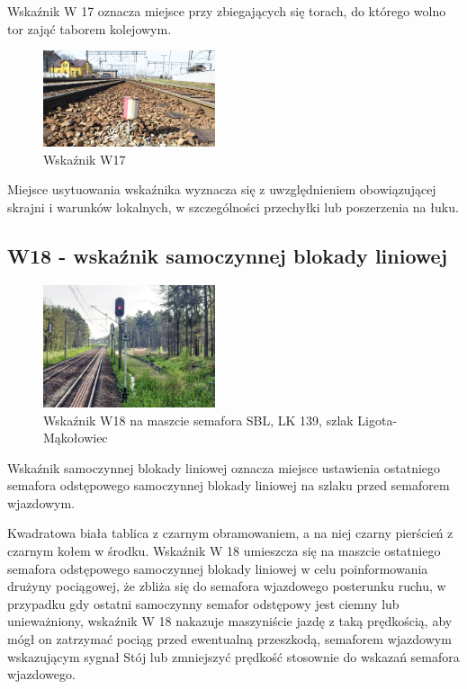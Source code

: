 \begin{tcolorbox}[colback=black!5!white,colframe=white!55!black,title=Wskaźnik W17]
Wskaźnik W 17 oznacza miejsce przy zbiegających się torach, do którego wolno tor zająć taborem kolejowym. 
\end{tcolorbox}
\begin{figure}
	\includegraphics[width=0.45\textwidth]{skryptkierownik-img/ukres.jpg}
	\caption{Wskaźnik W17}
\end{figure}
Miejsce usytuowania wskaźnika wyznacza się z uwzględnieniem obowiązującej skrajni i warunków lokalnych, w szczególności przechyłki lub poszerzenia na łuku.




\subsection{W18 - wskaźnik samoczynnej blokady liniowej}

	\begin{figure}
	\includegraphics[width=0.45\textwidth]{skryptkierownik-img/wskaznik-w18.jpg}
	\caption{Wskaźnik W18 na maszcie semafora SBL, LK 139, szlak Ligota- Mąkołowiec}
\end{figure}
\begin{tcolorbox}[colback=black!5!white,colframe=white!55!black,title=Wskaźnik W18] {\textquotedbl}Wskaźnik samoczynnej blokady liniowej{\textquotedbl} oznacza miejsce ustawienia ostatniego semafora odstępowego samoczynnej blokady liniowej na szlaku przed semaforem wjazdowym. 
\end{tcolorbox}
Kwadratowa biała tablica z czarnym obramowaniem, a na niej czarny pierścień z czarnym kołem w środku. Wskaźnik W 18 umieszcza się na maszcie ostatniego semafora odstępowego samoczynnej blokady liniowej w celu poinformowania drużyny pociągowej, że zbliża się do semafora wjazdowego posterunku ruchu, w przypadku gdy ostatni samoczynny semafor odstępowy jest ciemny lub
unieważniony, wskaźnik W 18 nakazuje maszyniście jazdę z taką prędkością, aby mógł on zatrzymać pociąg przed ewentualną przeszkodą, semaforem wjazdowym wskazującym sygnał {\textquotedbl}Stój{\textquotedbl} lub zmniejszyć prędkość stosownie do wskazań semafora wjazdowego.

